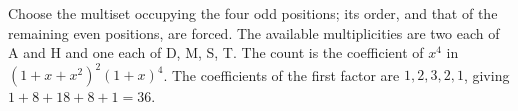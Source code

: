 Choose the multiset occupying the four odd positions; its order, and that of the remaining even positions, are forced. The available multiplicities are two each of A and H and one each of D, M, S, T. The count is the coefficient of $x^4$ in $(1+x+x^2)^2(1+x)^4$. The coefficients of the first factor are $1,2,3,2,1$, giving $1+8+18+8+1=\boxed{36}$.
